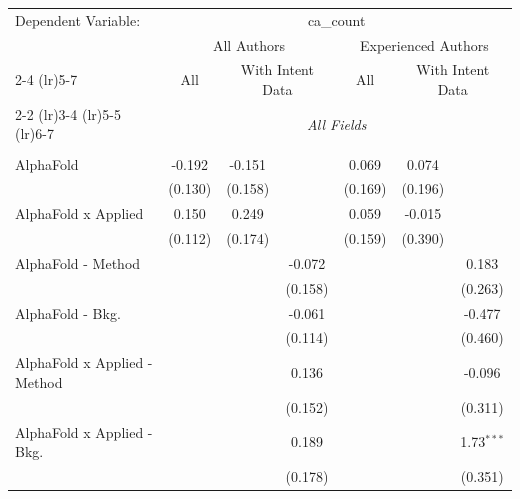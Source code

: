 \begingroup
\centering
\begin{tabular}{lcccccc}
   \tabularnewline \midrule \midrule
   Dependent Variable: & \multicolumn{6}{c}{ca\_count}\\
 & \multicolumn{3}{c}{All Authors} & \multicolumn{3}{c}{Experienced Authors} \\
\cmidrule(lr){2-4} \cmidrule(lr){5-7}
 & \multicolumn{1}{c}{All} & \multicolumn{2}{c}{With Intent Data} & \multicolumn{1}{c}{All} & \multicolumn{2}{c}{With Intent Data} \\
\cmidrule(lr){2-2} \cmidrule(lr){3-4} \cmidrule(lr){5-5} \cmidrule(lr){6-7}
 & \multicolumn{6}{c}{\textit{All Fields}} \\ \\
   AlphaFold                      & -0.192         & -0.151       &               & 0.069         & 0.074         &   \\   
                                  & (0.130)        & (0.158)      &               & (0.169)       & (0.196)       &   \\   
   AlphaFold x Applied            & 0.150          & 0.249        &               & 0.059         & -0.015        &   \\   
                                  & (0.112)        & (0.174)      &               & (0.159)       & (0.390)       &   \\   
   AlphaFold - Method             &                &              & -0.072        &               &               & 0.183\\   
                                  &                &              & (0.158)       &               &               & (0.263)\\   
   AlphaFold - Bkg.               &                &              & -0.061        &               &               & -0.477\\   
                                  &                &              & (0.114)       &               &               & (0.460)\\   
   AlphaFold x Applied - Method   &                &              & 0.136         &               &               & -0.096\\   
                                  &                &              & (0.152)       &               &               & (0.311)\\   
   AlphaFold x Applied - Bkg.     &                &              & 0.189         &               &               & 1.73$^{***}$\\   
                                  &                &              & (0.178)       &               &               & (0.351)\\   

\end{tabular}
